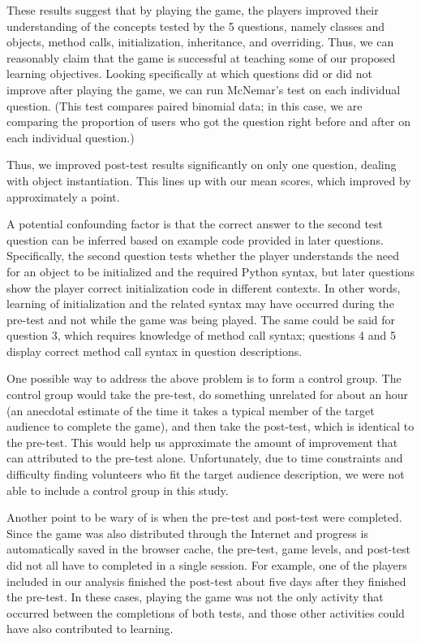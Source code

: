 \documentclass[12pt,notitlepage]{article}
\begin{document}
These results suggest that by playing the game, the players improved
their understanding of the concepts tested by the 5 questions, namely
classes and objects, method calls, initialization, inheritance, and
overriding. Thus, we can reasonably claim that the game is successful
at teaching some of our proposed learning objectives. Looking
specifically at which questions did or did not improve after playing
the game, we can run McNemar's test on each individual question. (This
test compares paired binomial data; in this case, we are comparing the
proportion of users who got the question right before and after on
each individual question.)


Thus, we improved post-test results significantly on only one question,
dealing with object instantiation. This lines up with our mean scores,
which improved by approximately a point.

A potential confounding factor is that the correct answer to the second
test question can be inferred based on example code provided in later
questions. Specifically, the second question tests whether the player
understands the need for an object to be initialized and the required Python
syntax, but later questions show the player correct initialization code in
different contexts. In other words, learning of initialization and the related
syntax may have occurred during the pre-test and not while the game was being
played. The same could be said for question 3, which requires knowledge of
method call syntax; questions 4 and 5 display correct method call syntax in
question descriptions.

One possible way to address the above problem is to form a control group.
The control group would take the pre-test, do something unrelated for about
an hour (an anecdotal estimate of the time it takes a typical member of the
target audience to complete the game), and then take the post-test, which is
identical to the pre-test. This would help us approximate the amount of
improvement that can attributed to the pre-test alone. Unfortunately, due to
time constraints and difficulty finding volunteers who fit the target audience
description, we were not able to include a control group in this study.

Another point to be wary of is when the pre-test and post-test were completed.
Since the game was also distributed through the Internet and progress is
automatically saved in the browser cache, the pre-test, game levels, and
post-test did not all have to completed in a single session. For example, one of
the players included in our analysis finished the post-test about five days
after they finished the pre-test. In these cases, playing the game was not the
only activity that occurred between the completions of both tests, and those
other activities could have also contributed to learning.
\end{document}
